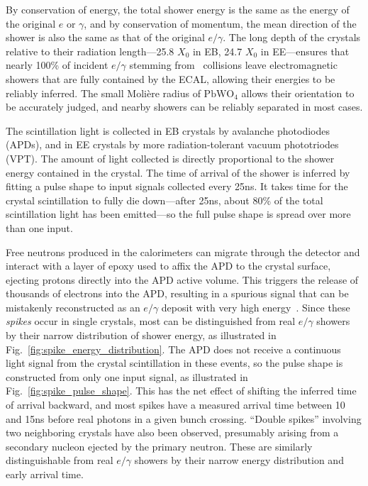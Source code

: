 \documentclass[oneside, letterpaper, 12pt, oldfontcommands]{memoir}
\begin{document}
By conservation of energy, the total shower energy is the same as the energy of the original $e$ or $\gamma$, and by conservation of momentum,
the mean direction of the shower is also the same as that of the original $e/\gamma$. The long depth of the crystals relative to their radiation
length---25.8 $X_{0}$ in EB, 24.7 $X_{0}$ in EE---ensures that nearly 100\% of incident $e/\gamma$ stemming
from \Pp\Pp\ collisions leave electromagnetic showers that are fully contained by the ECAL, allowing their energies to be reliably inferred.
The small Molière radius of $\mathrm{PbWO}_{4}$ allows their orientation to be accurately judged, and nearby showers can be reliably separated in most cases.

The scintillation light is collected in EB crystals by avalanche photodiodes (APDs), and in EE crystals by more radiation-tolerant
vacuum phototriodes (VPT). The amount of light collected is directly proportional to the shower energy contained in the crystal.
The time of arrival of the shower is inferred by fitting a pulse shape to input signals collected every 25\unit{ns}. It takes time for the
crystal scintillation to fully die down---after 25\unit{ns}, about 80\% of the total scintillation light has been emitted---so the full pulse shape
is spread over more than one input.

Free neutrons produced in the calorimeters can migrate through the detector and interact with a layer of epoxy used to affix the APD
to the crystal surface, ejecting protons directly into the APD active volume. This triggers the release of thousands of electrons into the APD,
resulting in a spurious signal that can be mistakenly reconstructed as an $e/\gamma$ deposit with very high energy~\cite{ref:1742-6596/404/1/012043}.
Since these \textit{spikes} occur in single crystals, most can be distinguished from real $e/\gamma$ showers by their narrow distribution of shower energy,
as illustrated in Fig.~\ref{fig:spike_energy_distribution}.
The APD does not receive a continuous light signal from the crystal scintillation in these events, so the pulse shape is constructed from
only one input signal, as illustrated in Fig.~\ref{fig:spike_pulse_shape}. This has the net effect of shifting the inferred time of arrival backward, and most spikes have a measured arrival time between 10 and 15\unit{ns}
before real photons in a given bunch crossing. ``Double spikes'' involving two neighboring crystals have also been observed, presumably
arising from a secondary nucleon ejected by the primary neutron. These are similarly distinguishable from real $e/\gamma$ showers by their narrow
energy distribution and early arrival time.
\end{document}

